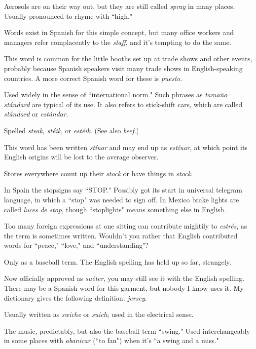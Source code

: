  Aerosols are on their way out, but they are still called
\emph{spray} in many places. Usually pronounced to rhyme with ``high."

 Words exist in Spanish for this simple concept, but
many office workers and managers refer complacently to the \emph{staff}, and
it's tempting to do the same.

 This word is common for the little booths set up at
trade shows and other events, probably because Spanish speakers visit
many trade shows in English-speaking countries. A more correct Spanish word for these is \emph{puesto}.

 Used widely in the sense of ``international
norm." Such phrases as \emph{tamaño stándard} are typical of its use. It
also refers to stick-shift cars, which are called \emph{stándard} or \emph{estándar}.

 Spelled \emph{steak, stéik}, or \emph{estéik}. (See also \emph{beef}.)

 This word has been written \emph{stíuar} and may end up
as \emph{estíuar}, at which point its English origins will be lost to the average
observer.

 Stores everywhere count up their \emph{stock} or have
things in \emph{stock}.

 In Spain the stopsigns say ``STOP." Possibly got its
start in universal telegram language, in which a ``stop" was needed to
sign off. In Mexico brake lights are called \emph{luces de stop}, though ``stoplights" means something else in English.

 Too many foreign expressions at one sitting can
contribute mightily to \emph{estrés}, as the term is sometimes written.
Wouldn't you rather that English contributed words for ``peace,"
``love," and ``understanding"?

 Only as a baseball term. The English spelling has
held up so far, strangely.

 Now officially approved as \emph{suéter}, you may still
see it with the English spelling. There may be a Spanish word for this
garment, but nobody I know uses it. My dictionary gives the following
definition: \emph{jersey}.

 Usually written as \emph{swiche} or \emph{suich}; used in the electrical sense.

 The music, predictably, but also the baseball term
``swing." Used interchangeably in some places with \emph{abanicar} (``to fan")
when it's ``a swing and a miss."

